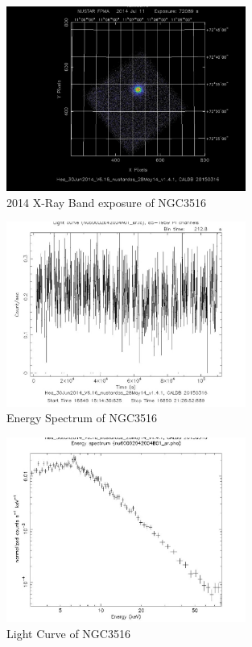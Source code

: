 \documentclass[letterpaper,11pt,twocolumn]{article}
\begin{document}
\begin{figure}[t]
\includegraphics[width=0.7\textwidth]{Images/Image_A.pdf} 
\caption{
2014 X-Ray Band exposure of NGC3516 {\it \citet{H+19}}
\label{fig:Image_B.gif}
}
\end{figure}

\begin{figure}[t]
\includegraphics[width=0.7\textwidth]{Images/Light_Curve_A.pdf} 
\caption{
Energy Spectrum of NGC3516 {\it \citet{H+19}}
\label{fig:Energy_B.pdf}
}
\end{figure}


\begin{figure}[t]
\includegraphics[width=0.7\textwidth]{Images/Light_Curve_B.pdf} 
\caption{
Light Curve of NGC3516 {\it \citet{H+19}}
\label{fig:Light_Curve_A.pdf}
}
\end{figure}
\end{document}

